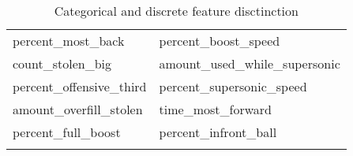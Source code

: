 \begin{longtable}{p{} p{}}
percent\_most\_back                     & percent\_boost\_speed                   \\
count\_stolen\_big                      & amount\_used\_while\_supersonic         \\
percent\_offensive\_third               & percent\_supersonic\_speed              \\
amount\_overfill\_stolen                & time\_most\_forward                     \\
percent\_full\_boost                    & percent\_infront\_ball                  \\
\bottomrule
\caption{Categorical and discrete feature disctinction}
\label{tab:catdiscr}             
\end{longtable}